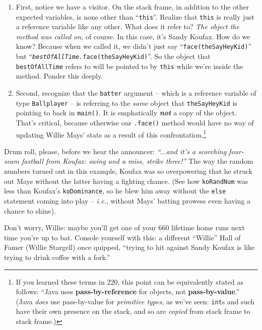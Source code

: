 \begin{enumerate}
\itemsep.1em
\item First, notice we have a visitor. On the stack frame, in addition to the
other expected variables, is none other than ``\texttt{this}''. Realize that
\texttt{this} is really just a reference variable like any other. What does it
refer to? \textit{The object the method was called on}, of course. In this
case, it's Sandy Koufax. How do we know? Because when we called it, we didn't
just say ``\texttt{face(theSayHeyKid)}'' but
``\texttt{\textit{bestOfAllTime.}face(theSayHeyKid)}''. So the object that
\texttt{bestOfAllTime} refers to will be pointed to by \texttt{this} while
we're inside the method. Ponder this deeply.

\item Second, recognize that the \texttt{batter} argument -- which is a
reference variable of type \texttt{Ballplayer} -- is referring to the
\textit{same} object that \texttt{theSayHeyKid} is pointing to back in
\texttt{main()}. It is emphatically \textbf{\textit{not}} a copy of the
object. That's critical, because otherwise our \texttt{.face()} method would
have no way of updating Willie Mays' stats as a result of this
confrontation.\footnote{If you learned these terms in 220, this point can be
equivalently stated as follows: ``Java uses \textbf{pass-by-reference} for
objects, not \textbf{pass-by-value}.'' (Java \textit{does} use pass-by-value
for \textit{primitive types}, as we've seen: \texttt{int}s and such have their
own presence on the stack, and so are \textit{copied} from stack frame to
stack frame.)}

\end{enumerate}

Drum roll, please, before we hear the announcer: \textit{``...and it's a
scorching four-seam fastball from Koufax: swing and a miss, strike three!''}
The way the random numbers turned out in this example, Koufax was so
overpowering that he struck out Mays without the latter having a fighting
chance. (See how \texttt{koRandNum} was less than Koufax's
\texttt{koDominance}, so he blew him away without the \texttt{else} statement
coming into play -- \textit{i.e.}, without Mays' batting prowess even having a
chance to shine).

Don't worry, Willie: maybe you'll get one of your 660 lifetime home runs next
time you're up to bat. Console yourself with this: a different ``Willie'' Hall
of Famer (Willie Stargell) once quipped, ``trying to hit against Sandy Koufax
is like trying to drink coffee with a fork.''


